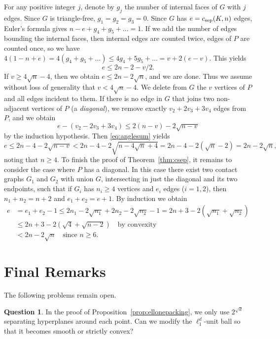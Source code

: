 \documentclass[a4paper,12pt]{article}
\theoremstyle{plain}
\theoremstyle{definition}
\newtheorem{question}[theorem]{Question}
\newcommand{\csep}{c_{\textnormal{sep}}} %
\begin{document}
For any positive integer $j$, denote by $g_j$ the number of internal faces of 
$G$ with $j$ edges. Since $G$ is triangle-free, $g_1=g_2=g_3=0$. Since $G$ has 
$e=\csep(K,n)$ edges, Euler's formula gives $n-e+g_4+g_5+\ldots=1$. If we 
add the number of edges bounding the internal faces, then internal edges are 
counted twice, edges of $P$ are counted once, so we have 
$4(1-n+e)=4(g_4+g_5+\ldots)\leq 4g_4+5g_5+\ldots=v+2(e-v)$. 
This yields 
\begin{equation}\label{eq:smallbound1}
 e\leq 2n-2-v/2.
\end{equation}
If $v\geq 4\sqrt{n}-4$, then we obtain $e\leq 2n-2\sqrt{n}$, and we are done.
Thus we assume without loss of generality that $v < 4\sqrt{n}-4$.
We delete from $G$ the $v$ vertices of $P$ and all edges incident to them. If there is no edge in $G$ that joins two non-adjacent vertices of $P$ (a \emph{diagonal}), we remove exactly $v_2+2v_3+3v_4$ edges from $P$, and we 
obtain
\[e-(v_2-2v_3+3v_4)\leq 2(n-v)-2\sqrt{n-v}\]by the induction hypothesis.
Then \eqref{eq:anglesum} yields
\begin{equation*}%
 e\leq 2n-4-2\sqrt{n-v} < 2n-4-2\sqrt{n-4\sqrt{n}+4} = 2n-4-2(\sqrt{n}-2) = 2n-2\sqrt{n},
\end{equation*}
noting that $n\geq 4$.
To finish the proof of Theorem~\ref{thm:csep}, it remains to consider the case where $P$ has a diagonal.
In this case there exist two contact graphs $G_1$ and $G_2$ with union $G$, intersecting in just the diagonal and its two endpoints, such that if $G_i$ has $n_i\geq 4$ vertices and $e_i$ edges ($i=1,2$), then $n_1+n_2=n+2$ and $e_1+e_2=e+1$.
By induction we obtain
\begin{align*}
e &=e_1+e_2-1\leq 2n_1-2\sqrt{n_1} + 2n_2-2\sqrt{n_2} -1 = 2n+3-2(\sqrt{n_1} + \sqrt{n_2})\\
&\leq 2n+3-2(\sqrt{4}+\sqrt{n-2}) \quad\text{by convexity}\\
&< 2n-2\sqrt{n}\quad\text{since $n\geq 6$}.
\end{align*}

\section{Final Remarks}\label{sec:final}

The following problems remain open.

\begin{question}
In the proof of Proposition~\ref{prop:ellonepacking}, we only use $2^{\sqrt{d}}$ 
separating hyperplanes around each point. Can we modify the $\ell_1^d$-unit ball 
so that it becomes smooth or strictly convex? 
\end{question}
 
\end{document}
